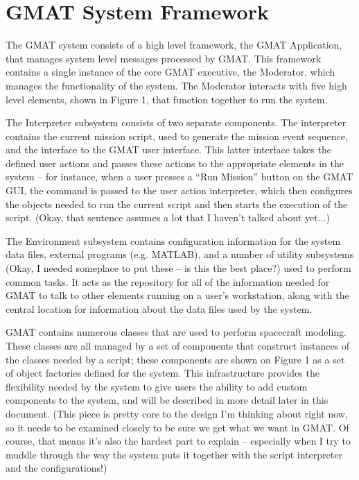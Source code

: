 \chapter{GMAT System Framework}


The GMAT system consists of a high level framework, the GMAT Application, that manages system level
messages processed by GMAT.  This framework contains a single instance of the core GMAT executive,
the Moderator, which manages the functionality of the system.  The Moderator interacts with five
high level elements, shown in Figure 1, that function together to run the system.

The Interpreter subsystem consists of two separate components.  The interpreter contains the current
mission script, used to generate the mission event sequence, and the interface to the GMAT user
interface.  This latter interface takes the defined user actions and passes these actions to the
appropriate elements in the system -- for instance, when a user presses a ``Run Mission'' button on
the GMAT GUI, the command is passed to the user action interpreter, which then configures the
objects needed to run the current script and then starts the execution of the script.  (Okay, that
sentence assumes a lot that I haven't talked about yet...)

The Environment subsystem contains configuration information for the system data files, external
programs (e.g. MATLAB), and a number of utility subsystems (Okay, I needed someplace to put these --
is this the best place?) used to perform common tasks.  It acts as the repository for all of the
information needed for GMAT to talk to other elements running on a user's workstation, along with
the central location for information about the data files used by the system.

GMAT contains numerous classes that are used to perform spacecraft modeling.  These classes are all
managed by a set of components that construct instances of the classes needed by a script; these
components are shown on Figure 1 as a set of object factories defined for the system.  This
infrastructure provides the flexibility needed by the system to give users the ability to add custom
components to the system, and will be described in more detail later in this document.  (This piece
is pretty core to the design I'm thinking about right now, so it needs to be examined closely to be
sure we get what we want in GMAT.  Of course, that means it's also the hardest part to explain --
especially when I try to muddle through the way the system puts it together with the script
interpreter and the configurations!)

